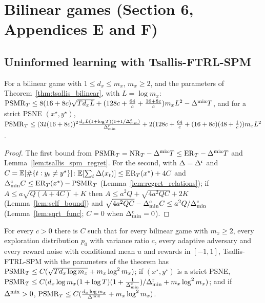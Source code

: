 \chapter{Bilinear games (Section 6, Appendices E and F)}
\label{chap:bilinear}

\section{Uninformed learning with Tsallis-FTRL-SPM}

\begin{lemma}
  \label{lem:tsallis_spm_psmr}
  \leanok
  For a bilinear game with $1 \le d_x \le m_x$, $m_x \ge 2$, and the parameters of
  Theorem~\ref{thm:tsallis_bilinear}, with $L = \log m_x$: $\mathrm{PSMR}_T \le 8(16 + 8c)\sqrt{T d_x L} +
  (128c + \frac{64}{c} + \frac{16 + 8c}{c}) m_x L^2 - \Delta^{\mathrm{mix}} T$, and for a strict PSNE $(x^\star,
  y^\star)$, $\mathrm{PSMR}_T \le (32(16 + 8c))^2 \frac{d_x L (1 + \log T)(1 + 1/\Delta^{\mathrm{c}}_{\min})}{\Delta^{\mathrm{r}}_{\min}} + 2(128c
  + \frac{64}{c} + (16 + 8c)(48 + \frac1c)) m_x L^2$.
\end{lemma}

\begin{proof}
  \leanok
  The first bound from $\mathrm{PSMR}_T = \mathrm{NR}_T - \Delta^{\mathrm{mix}} T \le \mathrm{ER}_T - \Delta^{\mathrm{mix}} T$ and
  Lemma~\ref{lem:tsallis_spm_regret}. For the second, with $\Delta = \Delta^{\mathrm{r}}$ and $C =
  \mathbb{E}[\#\{t : y_t \ne y^\star\}]$: $\mathbb{E}[\sum_t \Delta(x_t)] \le \mathrm{ER}_T(x^\star) + 4C$ and $\Delta^{\mathrm{c}}_{\min} C \le
  \mathrm{ER}_T(x^\star) - \mathrm{PSMR}_T$ (Lemma~\ref{lem:regret_relations}); if $A \le a\sqrt{Q(A + 4C)} + K$
  then $A \le a^2 Q + \sqrt{4a^2QC} + 2K$ (Lemma~\ref{lem:self_bound}) and $\sqrt{4a^2QC} - \Delta^{\mathrm{c}}_{\min} C
  \le a^2 Q/\Delta^{\mathrm{c}}_{\min}$ (Lemma~\ref{lem:sqrt_func}; $C = 0$ when $\Delta^{\mathrm{c}}_{\min} = 0$).
\end{proof}

\begin{theorem}[Theorem 5]
  \label{thm:tsallis_bilinear}
  \leanok
  For every $c > 0$ there is $C$ such that for every bilinear game with $m_x \ge 2$, every exploration
  distribution $p_0$ with variance ratio $c$, every adaptive adversary and every reward noise with
  conditional mean $u$ and rewards in $[-1, 1]$, Tsallis-FTRL-SPM with the parameters of the
  theorem has $\mathrm{PSMR}_T \le C(\sqrt{T d_x \log m_x} + m_x \log^2 m_x)$; if $(x^\star, y^\star)$ is a
  strict PSNE, $\mathrm{PSMR}_T \le C(d_x \log m_x (1 + \log T)(1 + \frac{1}{\Delta^{\mathrm{c}}_{\min}})/\Delta^{\mathrm{r}}_{\min} + m_x \log^2 m_x)$;
  and if $\Delta^{\mathrm{mix}} > 0$, $\mathrm{PSMR}_T \le C(\frac{d_x \log m_x}{\Delta^{\mathrm{mix}}} + m_x \log^2 m_x)$.
\end{theorem}

